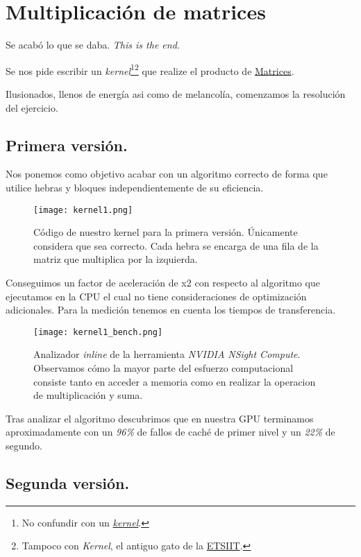 \section{Multiplicación de matrices}

Se acabó lo que se daba. \textit{This is the end.}

Se nos pide escribir un \textit{kernel}\footnote{
No confundir con un \href{https://en.wikipedia.org/wiki/Kernel}{\textit{kernel}}.}\footnote{
Tampoco con \textit{Kernel}, el antiguo gato de la \href{https://etsiit.ugr.es}{ETSIIT}.}
que realize el producto de \href{http://matrices.net/tutorials.htm}{Matrices}.


Ilusionados, llenos de energía asi como de melancolía, comenzamos la resolución del ejercicio.

\subsection{Primera versión.}

Nos ponemos como objetivo acabar con un algoritmo correcto de forma que utilice
hebras y bloques independientemente de su eficiencia.

\begin{figure}[H]
    \centering
    \texttt{[image: kernel1.png]}
    \caption{Código de nuestro kernel para la primera versión. Únicamente considera que sea correcto.
    Cada hebra se encarga de una fila de la matriz que multiplica por la izquierda.}
\end{figure}

Conseguimos un factor de aceleración de x2 con respecto al algoritmo que ejecutamos en la CPU el cual no tiene consideraciones de optimización
adicionales. Para la medición tenemos en cuenta los tiempos de transferencia.

\begin{figure}[H]
    \centering
    \texttt{[image: kernel1\_bench.png]}
    \caption{Analizador \textit{inline} de la herramienta \textit{NVIDIA NSight Compute}. Observamos cómo la mayor
    parte del esfuerzo computacional consiste tanto en acceder a memoria como en realizar la operacion de multiplicación y suma.}
\end{figure}

Tras analizar el algoritmo descubrimos que en nuestra GPU terminamos aproximadamente con un \textit{96\%} de fallos de caché de 
primer nivel y un \textit{22\%} de segundo.

\subsection{Segunda versión.}

